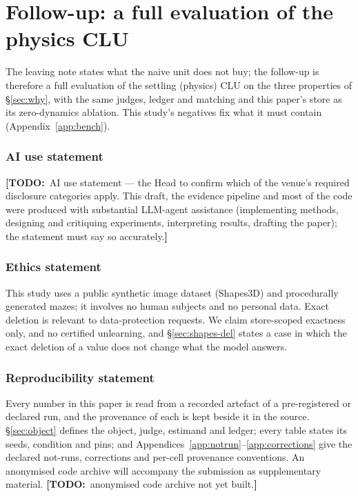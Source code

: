\documentclass{article} %
\newcommand{\TODO}[1]{{\color{orange}\textbf{[TODO:}~#1\textbf{]}}}
\begin{document}
\section{Follow-up: a full evaluation of the physics CLU}
\label{sec:followup}

The leaving note states what the naive unit does not buy; the follow-up is therefore a full evaluation of the settling (physics) CLU on the three properties of \S\ref{sec:why}, with the same judges, ledger and matching and this paper's store as its zero-dynamics ablation. This study's negatives fix what it must contain (Appendix~\ref{app:bench}).

\subsubsection*{AI use statement}
\TODO{AI use statement --- the Head to confirm which of the venue's required disclosure categories
apply. This draft, the evidence pipeline and most of the code were produced with substantial LLM-agent
assistance (implementing methods, designing and critiquing experiments, interpreting results,
drafting the paper); the statement must say so accurately.}

\subsubsection*{Ethics statement}
This study uses a public synthetic image dataset (Shapes3D) and procedurally generated mazes; it
involves no human subjects and no personal data. Exact deletion is relevant to data-protection
requests. We claim store-scoped exactness only, and no certified unlearning, and
\S\ref{sec:shapes-del} states a case in which the exact deletion of a value does not change what
the model answers.

\subsubsection*{Reproducibility statement}
Every number in this paper is read from a recorded artefact of a pre-registered or declared run,
and the provenance of each is kept beside it in the source. \S\ref{sec:object} defines the
object, judge, estimand and ledger; every table states its seeds, condition and pins; and
Appendices~\ref{app:notrun}--\ref{app:corrections} give the declared not-runs, corrections and
per-cell provenance conventions. An anonymised code archive will accompany the submission as
supplementary material. \TODO{anonymised code archive not yet built.}
\end{document}

